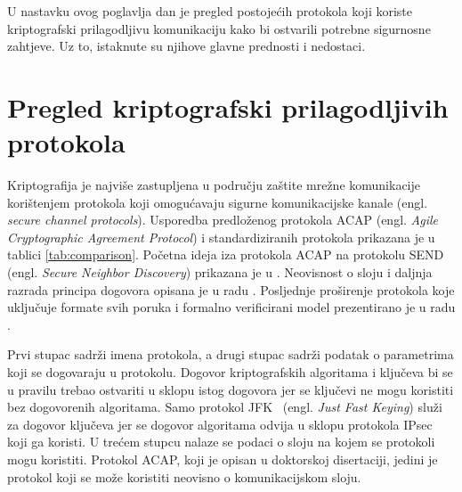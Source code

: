 U nastavku ovog poglavlja dan je pregled postojećih protokola koji koriste
kriptografski prilagodljivu komunikaciju kako bi ostvarili potrebne sigurnosne
zahtjeve. Uz to, istaknute su njihove glavne prednosti i nedostaci.

\section{Pregled kriptografski prilagodljivih protokola}

Kriptografija je najviše zastupljena u području zaštite mrežne komunikacije
korištenjem protokola koji omogućavaju sigurne komunikacijske kanale (engl.
\emph{secure channel protocols}). Usporedba predloženog protokola ACAP (engl.
\emph{Agile Cryptographic Agreement Protocol}) i
standardiziranih protokola prikazana je u tablici \ref{tab:comparison}.
Početna ideja iza protokola ACAP na protokolu SEND \cite{rfc3971} (engl.
\emph{Secure Neighbor Discovery}) prikazana je u \cite{vasic2011deploying}.
Neovisnost o sloju i daljnja razrada principa dogovora opisana je u radu
\cite{ACNP}. Posljednje proširenje protokola koje uključuje formate svih poruka
i formalno verificirani model prezentirano je u radu
\cite{vasic2016lightweight}.

Prvi stupac sadrži imena protokola, a drugi stupac sadrži
podatak o parametrima koji se dogovaraju u protokolu. Dogovor
kriptografskih algoritama i ključeva bi se u pravilu trebao ostvariti u sklopu
istog dogovora jer se ključevi ne mogu koristiti bez dogovorenih algoritama.
Samo protokol JFK~\cite{aiello2004jfk} (engl. \emph{Just Fast Keying}) služi za
dogovor ključeva jer se dogovor
algoritama odvija u sklopu protokola IPsec~\cite{rfc4301} koji ga koristi. U
trećem stupcu nalaze se podaci o sloju na kojem se protokoli mogu koristiti.
Protokol ACAP, koji je opisan u doktorskoj disertaciji, jedini je protokol
koji se može koristiti neovisno o komunikacijskom sloju.

